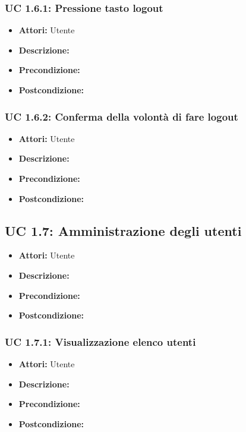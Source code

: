 \subsubsection{UC 1.6.1: Pressione tasto logout}

\begin{itemize}
\item \textbf{Attori:} Utente
\item \textbf{Descrizione:} 
\item \textbf{Precondizione:} 
\item \textbf{Postcondizione:} 
\end{itemize}

\subsubsection{UC 1.6.2: Conferma della volontà di fare logout}

\begin{itemize}
\item \textbf{Attori:} Utente
\item \textbf{Descrizione:} 
\item \textbf{Precondizione:} 
\item \textbf{Postcondizione:} 
\end{itemize}



\subsection{UC 1.7: Amministrazione degli utenti}

\begin{itemize}
\item \textbf{Attori:} Utente
\item \textbf{Descrizione:} 
\item \textbf{Precondizione:} 
\item \textbf{Postcondizione:} 
\end{itemize}

\subsubsection{UC 1.7.1: Visualizzazione elenco utenti}

\begin{itemize}
\item \textbf{Attori:} Utente
\item \textbf{Descrizione:} 
\item \textbf{Precondizione:} 
\item \textbf{Postcondizione:} 
\end{itemize}

